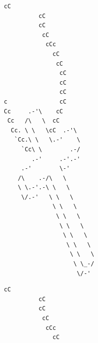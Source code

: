 
\hypersetup{pageanchor=false}
\begin{titlepage}
\thispagestyle{empty}
\ifmorkforside
\else
\fi
\newsavebox{\asciiboks}\newsavebox{\asciiskygge}
\begin{lrbox}{\asciiboks}\begin{minipage}{7.2cm}
\begin{lstlisting}[language={},backgroundcolor={},frame=none,xleftmargin=0pt,framexleftmargin=0pt,aboveskip=0pt,belowskip=0pt,columns=fixed,keepspaces=true,upquote=true,breaklines=false,literate={},basicstyle=\ttfamily\bfseries\fontsize{11.5}{12.4}\selectfont\color{forsidetekst}]
           cC
          cC
          cC
           cC
            cCc
              cC
               cC
                cC
                cC
                cC
c               cC
Cc     .-'\    cC
 Cc   /\   \  cC
  Cc. \ \   \cC  .-'\
   `Cc.\ \   \.-'    \
     `Cc\ \        .-/
        .-'     .-'.-'
     .-'        \-'
    /\    .-/\   \
    \ \.-'.-\ \   \
     \/.-'   \ \   \
              \ \   \
               \ \   \
                \ \   \
                 \ \   \
                  \ \   \
                   \ \   \
                    \ \_-/
                     \/-'
\end{lstlisting}
\end{minipage}\end{lrbox}
\begin{lrbox}{\asciiskygge}\begin{minipage}{7.2cm}
\begin{lstlisting}[language={},backgroundcolor={},frame=none,xleftmargin=0pt,framexleftmargin=0pt,aboveskip=0pt,belowskip=0pt,columns=fixed,keepspaces=true,upquote=true,breaklines=false,literate={},basicstyle=\ttfamily\bfseries\fontsize{11.5}{12.4}\selectfont\color{black}]
           cC
          cC
          cC
           cC
            cCc
              cC

\end{lstlisting}
\end{minipage}
\end{lrbox}
\end{titlepage}
